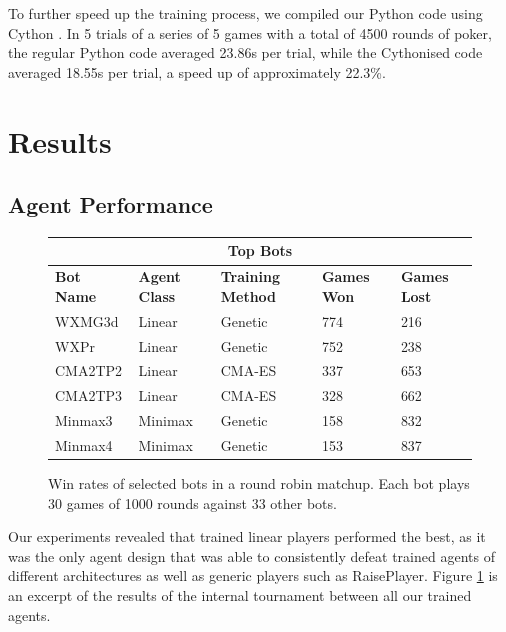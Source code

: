 \documentclass{article}
\begin{document}
To further speed up the training process, we compiled our Python code using Cython \cite{behnel2010cython}. In 5 trials of a series of 5 games with a total of 4500 rounds of poker, the regular Python code averaged 23.86s per trial, while the Cythonised code averaged 18.55s per trial, a speed up of approximately 22.3\%.

\section{Results}
\subsection{Agent Performance}
\begin{figure}[h!]
\centering
\begin{tabular}{ |p{1.5cm}|p{1.5cm}|p{1.5cm}|p{1cm}|p{1cm}|  }
 \hline
 \multicolumn{5}{|c|}{\textbf{Top Bots}} \\
 \hline
 \textbf{Bot Name} & \textbf{Agent Class} & \textbf{Training Method} & \textbf{Games Won} & \textbf{Games Lost}\\
 \hline
WXMG3d & Linear & Genetic & 774 & 216\\
WXPr & Linear & Genetic & 752 & 238\\
CMA2TP2	& Linear & CMA-ES & 337 & 653\\
CMA2TP3	& Linear & CMA-ES & 328 & 662\\
Minmax3	& Minimax & Genetic & 158 & 832\\
Minmax4	& Minimax & Genetic & 153 & 837\\
 \hline
\end{tabular}
\caption{Win rates of selected bots in a round robin matchup. Each bot plays 30 games of 1000 rounds against 33 other bots.}
\label{winrate}
\end{figure}

Our experiments revealed that trained linear players performed the best, as it was the only agent design that was able to consistently defeat trained agents of different architectures as well as generic players such as RaisePlayer. Figure \ref{winrate} is an excerpt of the results of the internal tournament between all our trained agents.
\end{document}
